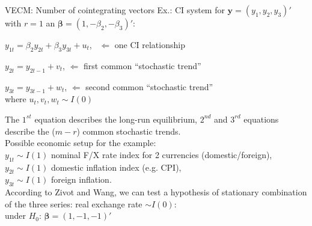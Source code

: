 \documentclass[usenames,dvipsnames]{beamer}
\begin{document}
\begin{frame}{VECM: Number of cointegrating vectors}
\footnotesize
Ex.: CI system for $\bm{y} = (y_1, y_2, y_3)'$ with $r=1$ an $\bm{\beta} = (1, -\beta_2, -\beta_3)'$:
\begin{enumerate}[ {[}1{]} ]
\item $y_{1t} = \beta_2 y_{2t} + \beta_3 y_{3t} + u_t$, \  $\Leftarrow$ one CI relationship
\item $y_{2t} = y_{2t-1} + v_t$, \hspace*{1.20cm} $\Leftarrow$ first common ``stochastic trend''
\item $y_{3t} = y_{3t-1} + w_t$, \hspace*{1.12cm} $\Leftarrow$ second common ``stochastic trend''\\
where $u_t, v_t, w_t \sim I(0)$
\end{enumerate}
The $1^{st}$ equation describes the long-run equilibrium, $2^{nd}$ and $3^{rd}$ equations describe the ($m-r$) common stochastic trends.\\
\medskip
Possible economic setup for the example:\\
\medskip
$y_{1t} \sim I(1)$ nominal F/X rate index for 2 currencies (domestic/foreign), \\ 
$y_{2t} \sim I(1)$ domestic inflation index (e.g. CPI), \\
$y_{3t} \sim I(1)$ foreign inflation. \\
\medskip
According to Zivot and Wang, we can test a hypothesis of stationary combination of the three series:  real exchange rate $\sim I(0)$:\\ under $H_0$: $\bm{\beta} = (1, -1, -1)'$ 
\end{frame}
\end{document}

